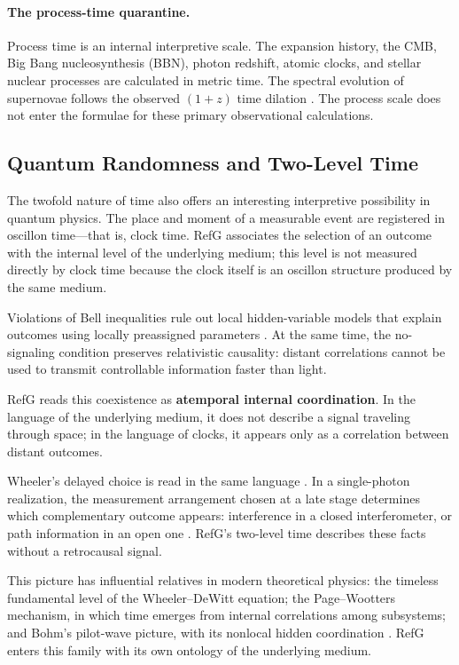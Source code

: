 \documentclass[11pt,a4paper]{article}
\begin{document}
\paragraph{The process-time quarantine.} Process time is an internal interpretive scale. The expansion history, the CMB, Big Bang nucleosynthesis (BBN), photon redshift, atomic clocks, and stellar nuclear processes are calculated in metric time. The spectral evolution of supernovae follows the observed $(1+z)$ time dilation \citep{blondin2008}. The process scale does not enter the formulae for these primary observational calculations.

\subsection{Quantum Randomness and Two-Level Time}

The twofold nature of time also offers an interesting interpretive possibility in quantum physics. The place and moment of a measurable event are registered in oscillon time---that is, clock time. RefG associates the selection of an outcome with the internal level of the underlying medium; this level is not measured directly by clock time because the clock itself is an oscillon structure produced by the same medium.

Violations of Bell inequalities rule out local hidden-variable models that explain outcomes using locally preassigned parameters \citep{bell1964,hensen2015}. At the same time, the no-signaling condition preserves relativistic causality: distant correlations cannot be used to transmit controllable information faster than light.

RefG reads this coexistence as \textbf{atemporal internal coordination}. In the language of the underlying medium, it does not describe a signal traveling through space; in the language of clocks, it appears only as a correlation between distant outcomes.

Wheeler's delayed choice is read in the same language \citep{wheeler1978}. In a single-photon realization, the measurement arrangement chosen at a late stage determines which complementary outcome appears: interference in a closed interferometer, or path information in an open one \citep{jacques2007}. RefG's two-level time describes these facts without a retrocausal signal.

This picture has influential relatives in modern theoretical physics: the timeless fundamental level of the Wheeler--DeWitt equation; the Page--Wootters mechanism, in which time emerges from internal correlations among subsystems; and Bohm's pilot-wave picture, with its nonlocal hidden coordination \citep{dewitt1967,pagewootters1983,bohm1952}. RefG enters this family with its own ontology of the underlying medium.
\end{document}
